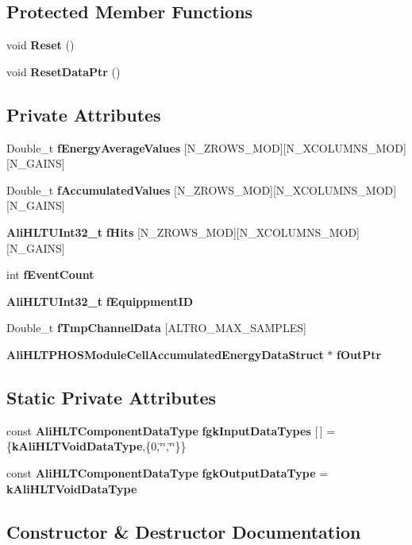 \subsection*{Protected Member Functions}
\begin{CompactItemize}
\item 
void {\bf Reset} ()
\item 
void {\bf Reset\-Data\-Ptr} ()
\end{CompactItemize}
\subsection*{Private Attributes}
\begin{CompactItemize}
\item 
Double\_\-t {\bf f\-Energy\-Average\-Values} [N\_\-ZROWS\_\-MOD][N\_\-XCOLUMNS\_\-MOD][N\_\-GAINS]
\item 
Double\_\-t {\bf f\-Accumulated\-Values} [N\_\-ZROWS\_\-MOD][N\_\-XCOLUMNS\_\-MOD][N\_\-GAINS]
\item 
{\bf Ali\-HLTUInt32\_\-t} {\bf f\-Hits} [N\_\-ZROWS\_\-MOD][N\_\-XCOLUMNS\_\-MOD][N\_\-GAINS]
\item 
int {\bf f\-Event\-Count}
\item 
{\bf Ali\-HLTUInt32\_\-t} {\bf f\-Equippment\-ID}
\item 
Double\_\-t {\bf f\-Tmp\-Channel\-Data} [ALTRO\_\-MAX\_\-SAMPLES]
\item 
{\bf Ali\-HLTPHOSModule\-Cell\-Accumulated\-Energy\-Data\-Struct} $\ast$ {\bf f\-Out\-Ptr}
\end{CompactItemize}
\subsection*{Static Private Attributes}
\begin{CompactItemize}
\item 
const {\bf Ali\-HLTComponent\-Data\-Type} {\bf fgk\-Input\-Data\-Types} [$\,$] = \{{\bf k\-Ali\-HLTVoid\-Data\-Type},\{0,\char`\"{}\char`\"{},\char`\"{}\char`\"{}\}\}
\item 
const {\bf Ali\-HLTComponent\-Data\-Type} {\bf fgk\-Output\-Data\-Type} = {\bf k\-Ali\-HLTVoid\-Data\-Type}
\end{CompactItemize}


\subsection{Constructor \& Destructor Documentation}
